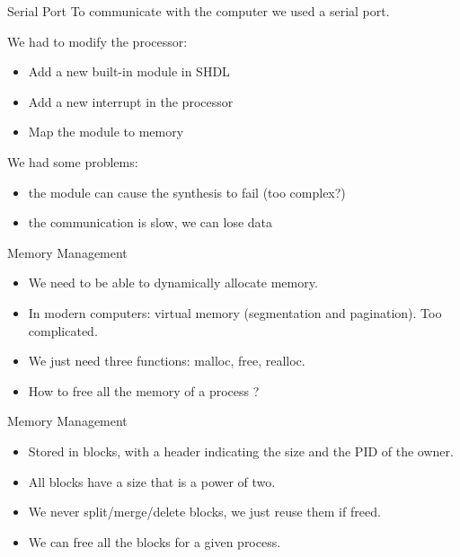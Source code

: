 \documentclass{beamer}
\begin{document}
    \begin{frame}{Serial Port}
      To communicate with the computer we used a serial port.

      \pause
      We had to modify the processor:
      \begin{itemize}
        \item Add a new built-in module in SHDL
        \item Add a new interrupt in the processor
        \item Map the module to memory
      \end{itemize}

      \pause
      We had some problems:
      \begin{itemize}
        \item the module can cause the synthesis to fail (too complex?)
        \item the communication is slow, we can lose data
      \end{itemize}
    \end{frame}

    \begin{frame}{Memory Management}
      \begin{itemize}
        \item We need to be able to dynamically allocate memory.
        \item In modern computers: virtual memory (segmentation and pagination). Too complicated.
        \item We just need three functions: malloc, free, realloc.
        \item How to free all the memory of a process ?
      \end{itemize}
    \end{frame}
    
    \begin{frame}{Memory Management}
      \begin{itemize}
        \item Stored in blocks, with a header indicating the size and the PID of the owner.
        \item All blocks have a size that is a power of two.
        \item We never split/merge/delete blocks, we just reuse them if freed.
        \item We can free all the blocks for a given process.
      \end{itemize}
    \end{frame}
\end{document}
